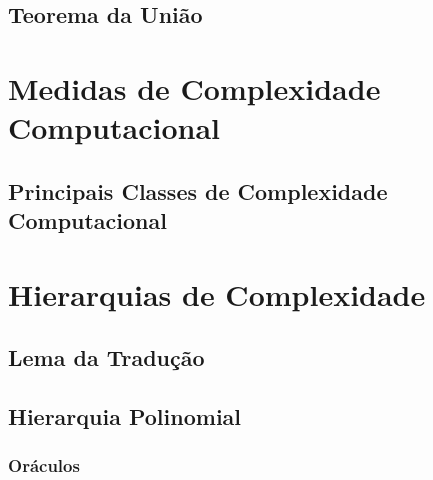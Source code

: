 \subsection{Teorema da União}

\section{Medidas de Complexidade Computacional}
\label{medidas_padrao}


\subsection{Principais Classes de Complexidade Computacional}

\section{Hierarquias de Complexidade}

\subsection{Lema da Tradução}

\subsection{Hierarquia Polinomial}

\subsubsection{Oráculos}
